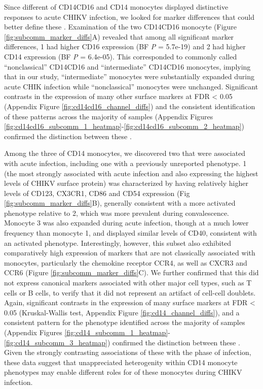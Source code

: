 Since different \subcommunities{} of CD14\sups{+}\allowbreak CD16\sups{+} and CD14\sups{+} monocytes displayed distinctive responses to acute CHIKV infection, we looked for marker differences that could better define these \subcommunities{}. Examination of the two CD14\sups{+}\allowbreak CD16\sups{+} monocyte \subcommunities{} (Figure \ref{fig:subcomm_marker_diffs}A) revealed that among all significant marker differences, \subcommunity{} 1 had higher CD16 expression (BF \emph{P} = 5.7e-19) and \subcommunity{} 2 had higher CD14 expression (BF \emph{P} = 6.4e-05). This corresponded to \subcommunities{} commonly called “nonclassical” CD14\sups{+}\allowbreak CD16\sups{++} and “intermediate” CD14\sups{++}\allowbreak CD16\sups{+} monocytes,\autocite{Wong2011,Ziegler-Heitbrock2010} implying that in our study, “intermediate” monocytes were substantially expanded during acute CHIK infection while “nonclassical” monocytes were unchanged. Significant contrasts in the expression of many other surface markers at FDR < 0.05 (Appendix Figure \ref{fig:cd14cd16_channel_diffs}) and the consistent identification of these patterns across the majority of samples (Appendix Figures \ref{fig:cd14cd16_subcomm_1_heatmap}-\ref{fig:cd14cd16_subcomm_2_heatmap}) confirmed the distinction between these \subcommunities{}.

Among the three \subcommunities{} of CD14\sups{+} monocytes, we discovered two that were associated with acute infection, including one with a previously unreported phenotype. \subcommunity{} 1 (the \subcommunity{} most strongly associated with acute infection and also expressing the highest levels of CHIKV surface protein) was characterized by having relatively higher levels of CD123, CX3CR1, CD86 and CD54 expression (Fig \ref{fig:subcomm_marker_diffs}B), generally consistent with a more activated phenotype relative to \subcommunity{} 2, which was more prevalent during convalescence. Monocyte \subcommunity{} 3 was also expanded during acute infection, though at a much lower frequency than monocyte \subcommunity{} 1, and displayed similar levels of CD40, consistent with an activated phenotype. Interestingly, however, this subset also exhibited comparatively high expression of markers that are not classically associated with monocytes, particularly the chemokine receptor CCR4, as well as CXCR3 and CCR6 (Figure \ref{fig:subcomm_marker_diffs}C). We further confirmed that this \subcommunity{} did not express canonical markers associated with other major cell types, such as T cells or B cells, to verify that it did not represent an artifact of cell-cell doublets. Again, significant contrasts in the expression of many surface markers at FDR < 0.05 (Kruskal-Wallis test, Appendix Figure \ref{fig:cd14_channel_diffs}), and a consistent pattern for the phenotype identified across the majority of samples (Appendix Figures \ref{fig:cd14_subcomm_1_heatmap}-\ref{fig:cd14_subcomm_3_heatmap}) confirmed the distinction between these \subcommunities{}. Given the strongly contrasting associations of these \subcommunities{} with the phase of infection, these data suggest that unappreciated heterogenity within CD14\sups{+} monocyte phenotypes may enable different roles for \subcommunities{} of these monocytes during CHIKV infection.  

